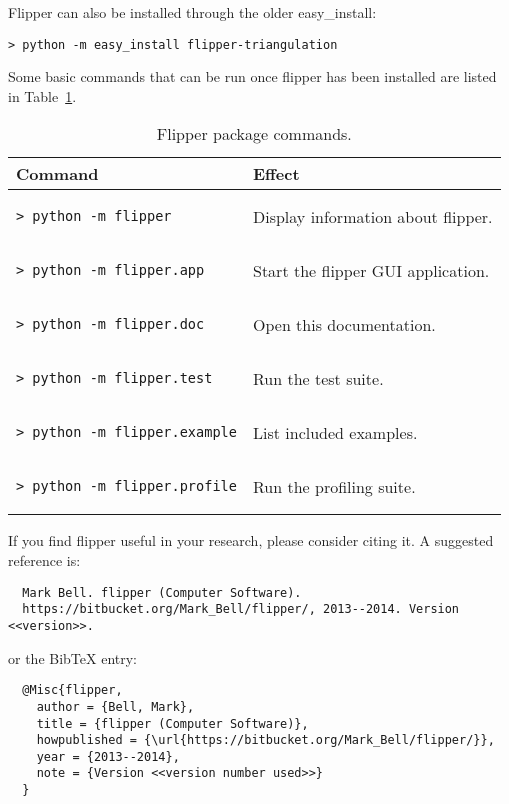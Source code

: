 \documentclass[a4paper]{article}
\begin{document}
Flipper can also be installed through the older easy\_install:
\begin{lstlisting}
> python -m easy_install flipper-triangulation
\end{lstlisting}

Some basic commands that can be run once flipper has been installed are listed in Table~\ref{tbl:package_commands}.

\begin{table}[ht]
\label{tbl:package_commands}
\begin{center}
\begin{tabular}{l|l}
Command & Effect \\
\hline
\begin{lstlisting}
> python -m flipper
\end{lstlisting} & Display information about flipper. \\

\begin{lstlisting}
> python -m flipper.app
\end{lstlisting} & Start the flipper GUI application. \\

\begin{lstlisting}
> python -m flipper.doc
\end{lstlisting} & Open this documentation. \\

\begin{lstlisting}
> python -m flipper.test
\end{lstlisting} & Run the test suite. \\

\begin{lstlisting}
> python -m flipper.example
\end{lstlisting} & List included examples. \\

\begin{lstlisting}
> python -m flipper.profile
\end{lstlisting} & Run the profiling suite. \\
\end{tabular}
\end{center}
\caption{Flipper package commands.}
\end{table}

If you find flipper useful in your research, please consider citing it. A suggested reference is:
\begin{verbatim}
  Mark Bell. flipper (Computer Software).
  https://bitbucket.org/Mark_Bell/flipper/, 2013--2014. Version <<version>>.
\end{verbatim}
or the BibTeX entry:
\begin{verbatim}
  @Misc{flipper,
    author = {Bell, Mark},
    title = {flipper (Computer Software)},
    howpublished = {\url{https://bitbucket.org/Mark_Bell/flipper/}},
    year = {2013--2014},
    note = {Version <<version number used>>}
  }
\end{verbatim}
\end{document}
